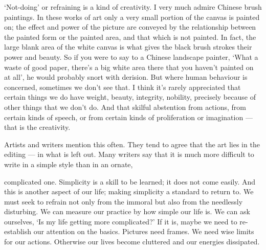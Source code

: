 `Not-doing' or refraining is a kind of creativity. I very much admire
Chinese brush paintings. In these works of art only a very small portion
of the canvas is painted on; the effect and power of the picture are
conveyed by the relationship between the painted form or the painted
area, and that which is not painted. In fact, the large blank area of
the white canvas is what gives the black brush strokes their power and
beauty. So if you were to say to a Chinese landscape painter, `What a
waste of good paper, there's a big white area there that you haven't
painted on at all', he would probably snort with derision. But where
human behaviour is concerned, sometimes we don't see that. I think it's
rarely appreciated that certain things we do have weight, beauty,
integrity, nobility, precisely because of other things that we don't do.
And that skilful abstention from actions, from certain kinds of speech,
or from certain kinds of proliferation or imagination --- that is the
creativity.

Artists and writers mention this often. They tend to agree that the art
lies in the editing --- in what is left out. Many writers say that it is
much more difficult to write in a simple style than in an ornate,

complicated one. Simplicity is a skill to be learned; it does not come
easily. And this is another aspect of our life; making simplicity a
standard to return to. We must seek to refrain not only from the immoral
but also from the needlessly disturbing. We can measure our practice by
how simple our life is. We can ask ourselves, `Is my life getting more
complicated?' If it is, maybe we need to re-establish our attention on
the basics. Pictures need frames. We need wise limits for our actions.
Otherwise our lives become cluttered and our energies dissipated.

